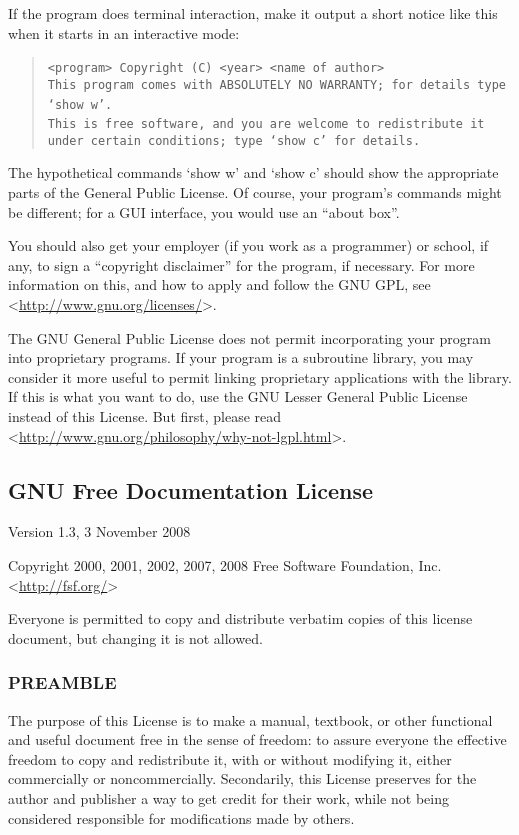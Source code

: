 \documentclass[10pt,english]{article}
\begin{document}
If the program does terminal interaction, make it output a short notice
like this when it starts in an interactive mode:
\begin{quote}
\texttt{<program> Copyright (C) <year> <name of author>}~\\
\texttt{This program comes with ABSOLUTELY NO WARRANTY; for details
type `show w'.}~\\
\texttt{This is free software, and you are welcome to redistribute
it}~\\
\texttt{under certain conditions; type `show c' for details.}
\end{quote}
The hypothetical commands `show w' and `show c' should show the appropriate
parts of the General Public License. Of course, your program's commands
might be different; for a GUI interface, you would use an \textquotedblleft{}about
box\textquotedblright{}.

You should also get your employer (if you work as a programmer) or
school, if any, to sign a \textquotedblleft{}copyright disclaimer\textquotedblright{}
for the program, if necessary. For more information on this, and how
to apply and follow the GNU GPL, see <\url{http://www.gnu.org/licenses/}>.

The GNU General Public License does not permit incorporating your
program into proprietary programs. If your program is a subroutine
library, you may consider it more useful to permit linking proprietary
applications with the library. If this is what you want to do, use
the GNU Lesser General Public License instead of this License. But
first, please read <\url{http://www.gnu.org/philosophy/why-not-lgpl.html}>.


\subsection{GNU Free Documentation License\label{sub:GNU-Free-Documentation}}

Version 1.3, 3 November 2008

Copyright  2000, 2001, 2002, 2007, 2008 Free Software Foundation,
Inc. <\url{http://fsf.org/}>

Everyone is permitted to copy and distribute verbatim copies of this
license document, but changing it is not allowed.


\subsubsection*{PREAMBLE}

The purpose of this License is to make a manual, textbook, or other
functional and useful document \textquotedbl{}free\textquotedbl{}
in the sense of freedom: to assure everyone the effective freedom
to copy and redistribute it, with or without modifying it, either
commercially or noncommercially. Secondarily, this License preserves
for the author and publisher a way to get credit for their work, while
not being considered responsible for modifications made by others.
\end{document}
